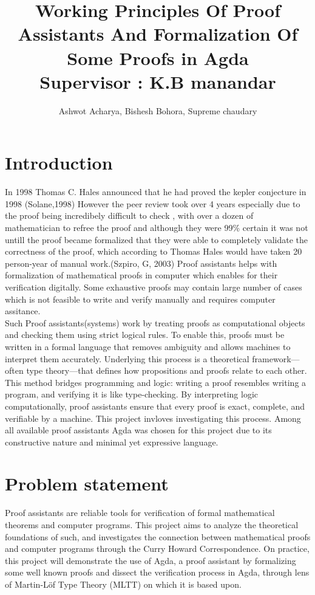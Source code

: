 \documentclass{article}
\title{
    {Working Principles Of Proof Assistants And Formalization Of Some Proofs in Agda}\\
    {\large Supervisor : K.B manandar}\\


    }
\author{ Ashwot Acharya, Bishesh Bohora, Supreme chaudary}
\begin{document}
\maketitle

\pagebreak
\section{Introduction}
In 1998 Thomas C. Hales announced that he had proved the kepler conjecture in 1998 (Solane,1998) However the peer review took over 4 years especially due to the proof being incredibely difficult to check , with over a dozen of mathematician to refree the proof and although 
they were 99\% certain it was not untill the proof became formalized that they were able to completely validate the correctness of the proof, which according to Thomas Hales would have taken 20 person-year of manual work.(Szpiro, G, 2003)
Proof assistants helps with formalization of mathematical proofs in computer which enables for their verification digitally.
Some exhaustive proofs may contain large number of cases which is not feasible to write and verify manually and requires computer assitance.\\ 
Such Proof assistants(systems) work by treating proofs as computational objects and checking them using strict logical rules. To enable this, proofs must be written in a formal language that removes ambiguity and allows machines to interpret them accurately. Underlying this process is a theoretical framework—often type theory—that defines how propositions and proofs relate to each other.
\\
This method bridges programming and logic: writing a proof resembles writing a program, and verifying it is like type-checking. By interpreting logic computationally, proof assistants ensure that every proof is exact, complete, and verifiable by a machine. This project invloves investigating this process. Among all available proof assistants Agda was chosen for this project due to its constructive nature and minimal yet expressive language.
\section{Problem statement}
Proof assistants are reliable tools for verification of formal mathematical theorems and computer programs. This project aims to analyze the theoretical foundations of such, and investigates the connection between mathematical proofs and computer programs through the Curry Howard Correspondence. On practice, this project will demonstrate the use of Agda, a proof assistant by formalizing some well known proofs and dissect the verification process in Agda, through lens of Martin-Löf Type Theory (MLTT) on which it is based upon. 
\end{document}
